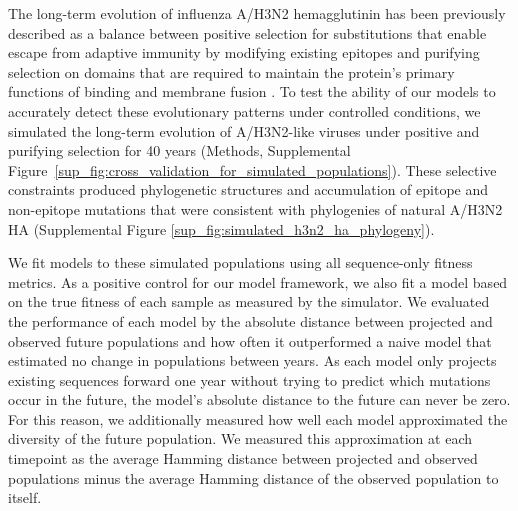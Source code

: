 The long-term evolution of influenza A/H3N2 hemagglutinin has been previously described as a balance between positive selection for substitutions that enable escape from adaptive immunity by modifying existing epitopes and purifying selection on domains that are required to maintain the protein's primary functions of binding and membrane fusion \cite{Bush:1999vj,Neher2013,Luksza:2014hj,Koelle:2015dh}.
To test the ability of our models to accurately detect these evolutionary patterns under controlled conditions, we simulated the long-term evolution of A/H3N2-like viruses under positive and purifying selection for 40 years (Methods, Supplemental Figure~\ref{sup_fig:cross_validation_for_simulated_populations}).
These selective constraints produced phylogenetic structures and accumulation of epitope and non-epitope mutations that were consistent with phylogenies of natural A/H3N2 HA (Supplemental Figure \ref{sup_fig:simulated_h3n2_ha_phylogeny}).

We fit models to these simulated populations using all sequence-only fitness metrics.
As a positive control for our model framework, we also fit a model based on the true fitness of each sample as measured by the simulator.
We evaluated the performance of each model by the absolute distance between projected and observed future populations and how often it outperformed a naive model that estimated no change in populations between years.
As each model only projects existing sequences forward one year without trying to predict which mutations occur in the future, the model's absolute distance to the future can never be zero.
For this reason, we additionally measured how well each model approximated the diversity of the future population.
We measured this approximation at each timepoint as the average Hamming distance between projected and observed populations minus the average Hamming distance of the observed population to itself.

